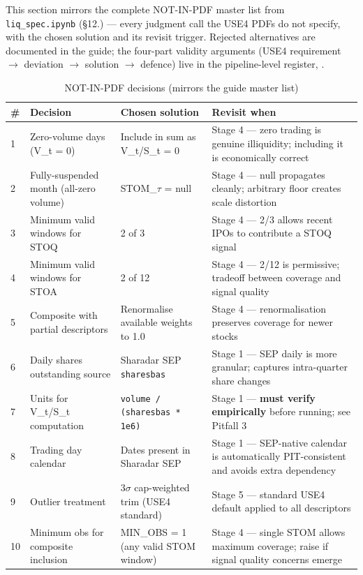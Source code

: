 \documentclass[11pt,a4paper]{article}
\begin{document}
This section mirrors the complete NOT-IN-PDF master list from
\texttt{liq\_spec.ipynb} (\S12.) --- every judgment call the USE4 PDFs do not
specify, with the chosen solution and its revisit trigger. Rejected alternatives
are documented in the guide; the four-part validity arguments (USE4 requirement
$\to$ deviation $\to$ solution $\to$ defence) live in the pipeline-level
register, .

\begin{longtable}{@{}p{0.5cm}p{3.6cm}p{6.0cm}p{3.8cm}@{}}
\caption{NOT-IN-PDF decisions (mirrors the guide master list)}\\
\toprule
\textbf{\#} & \textbf{Decision} & \textbf{Chosen solution} & \textbf{Revisit when} \\
\midrule
\endhead
1 & Zero-volume days (V\_t = 0) & Include in sum as V\_t/S\_t = 0 & Stage 4 --- zero trading is genuine illiquidity; including it is economically correct \\[3pt]
2 & Fully-suspended month (all-zero volume) & STOM\_$\tau$ = null & Stage 4 --- null propagates cleanly; arbitrary floor creates scale distortion \\[3pt]
3 & Minimum valid windows for STOQ & 2 of 3 & Stage 4 --- 2/3 allows recent IPOs to contribute a STOQ signal \\[3pt]
4 & Minimum valid windows for STOA & 2 of 12 & Stage 4 --- 2/12 is permissive; tradeoff between coverage and signal quality \\[3pt]
5 & Composite with partial descriptors & Renormalise available weights to 1.0 & Stage 4 --- renormalisation preserves coverage for newer stocks \\[3pt]
6 & Daily shares outstanding source & Sharadar SEP \texttt{sharesbas} & Stage 1 --- SEP daily is more granular; captures intra-quarter share changes \\[3pt]
7 & Units for V\_t/S\_t computation & \texttt{volume / (sharesbas * 1e6)} & Stage 1 --- \textbf{must verify empirically} before running; see Pitfall 3 \\[3pt]
8 & Trading day calendar & Dates present in Sharadar SEP & Stage 1 --- SEP-native calendar is automatically PIT-consistent and avoids extra dependency \\[3pt]
9 & Outlier treatment & 3$\sigma$ cap-weighted trim (USE4 standard) & Stage 5 --- standard USE4 default applied to all descriptors \\[3pt]
10 & Minimum obs for composite inclusion & MIN\_OBS = 1 (any valid STOM window) & Stage 4 --- single STOM allows maximum coverage; raise if signal quality concerns emerge \\[3pt]
\bottomrule
\end{longtable}
\end{document}
